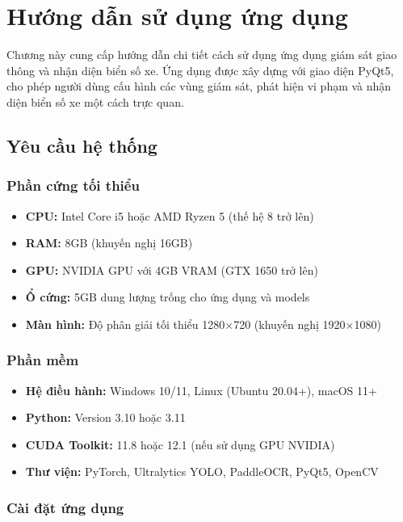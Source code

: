 ﻿\chapter{Hướng dẫn sử dụng ứng dụng}
\label{ch:huong_dan_su_dung}

Chương này cung cấp hướng dẫn chi tiết cách sử dụng ứng dụng giám sát giao thông và nhận diện biển số xe. Ứng dụng được xây dựng với giao diện PyQt5, cho phép người dùng cấu hình các vùng giám sát, phát hiện vi phạm và nhận diện biển số xe một cách trực quan.

\section{Yêu cầu hệ thống}

\subsection{Phần cứng tối thiểu}
\begin{itemize}
    \item \textbf{CPU:} Intel Core i5 hoặc AMD Ryzen 5 (thế hệ 8 trở lên)
    \item \textbf{RAM:} 8GB (khuyến nghị 16GB)
    \item \textbf{GPU:} NVIDIA GPU với 4GB VRAM (GTX 1650 trở lên)
    \item \textbf{Ổ cứng:} 5GB dung lượng trống cho ứng dụng và models
    \item \textbf{Màn hình:} Độ phân giải tối thiểu 1280×720 (khuyến nghị 1920×1080)
\end{itemize}

\subsection{Phần mềm}
\begin{itemize}
    \item \textbf{Hệ điều hành:} Windows 10/11, Linux (Ubuntu 20.04+), macOS 11+
    \item \textbf{Python:} Version 3.10 hoặc 3.11
    \item \textbf{CUDA Toolkit:} 11.8 hoặc 12.1 (nếu sử dụng GPU NVIDIA)
    \item \textbf{Thư viện:} PyTorch, Ultralytics YOLO, PaddleOCR, PyQt5, OpenCV
\end{itemize}

\subsection{Cài đặt ứng dụng}

